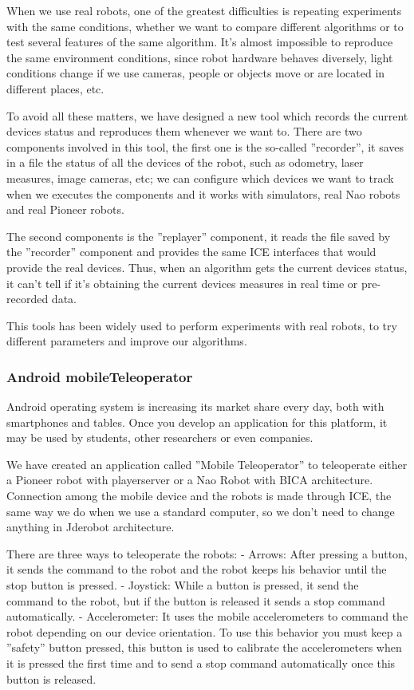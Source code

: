 \documentclass[twocolumn]{svjour3}          %
\begin{document}
When we use real robots, one of the greatest difficulties is repeating experiments with the same conditions, whether we want to compare different algorithms or to test several features of the same algorithm. It's almost impossible to reproduce the same environment conditions, since robot hardware behaves diversely, light conditions change if we use cameras, people or objects move or are located in different places, etc.

To avoid all these matters, we have designed a new tool which records the current devices status and reproduces them whenever we want to. There are two components involved in this tool, the first one is the so-called ''recorder'', it saves in a file the status of all the devices of the robot, such as odometry, laser measures, image cameras, etc; we can configure which devices we want to track when we executes the components and it works with simulators, real Nao robots and real Pioneer robots.

The second components is the ''replayer'' component, it reads the file saved by the ''recorder'' component and provides the same ICE interfaces that would provide the real devices. Thus, when an algorithm gets the current devices status, it can't tell if it's obtaining the current devices measures in real time or pre-recorded data.

This tools has been widely used to perform experiments with real robots, to try different parameters and improve our algorithms.

\subsubsection{Android mobileTeleoperator}

Android operating system is increasing its market share every day, both with smartphones and tables. Once you develop an application for this platform, it may be used by students, other researchers or even companies. 

We have created an application called ''Mobile Teleoperator'' to teleoperate either a Pioneer robot with playerserver or a Nao Robot with BICA architecture. Connection among the mobile device and the robots is made through ICE, the same way we do when we use a standard computer, so we don't need to change anything in Jderobot architecture.

There are three ways to teleoperate the robots:
- Arrows: After pressing a button, it sends the command to the robot and the robot keeps his behavior until the stop button is pressed.
- Joystick: While a button is pressed, it send the command to the robot, but if the button is released it sends a stop command automatically.
- Accelerometer: It uses the mobile accelerometers to command the robot depending on our device orientation. To use this behavior you must keep a ''safety'' button pressed, this button is used to calibrate the accelerometers when it is pressed the first time and to send a stop command automatically once this button is released.
\end{document}
